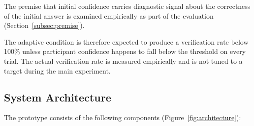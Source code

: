 \documentclass[oneside,final,14pt,a4paper]{extreport}
\theoremstyle{definition}
\theoremstyle{remark}
\begin{document}
The premise that initial confidence carries diagnostic signal about the
correctness of the initial answer is examined empirically as part of the
evaluation (Section~\ref{subsec:premise}).

The adaptive condition is therefore expected to produce a verification rate
below 100\% unless participant confidence happens to fall below the threshold
on every trial. The actual verification rate is measured empirically and is
not tuned to a target during the main experiment.

\subsection{System Architecture}
The prototype consists of the following components
(Figure~\ref{fig:architecture}):
\end{document}
